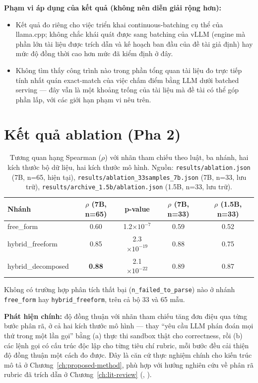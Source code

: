 \documentclass[a4paper,12pt]{report}
\begin{document}
\textbf{Phạm vi áp dụng của kết quả (không nên diễn giải rộng hơn):}
\begin{itemize}
  \item Kết quả đo riêng cho việc triển khai continuous-batching cụ thể của
    llama.cpp; không chắc khái quát được sang batching của vLLM (engine mà
    phần lớn tài liệu được trích dẫn và kế hoạch ban đầu của đề tài giả
    định) hay mức độ đồng thời cao hơn mức đã kiểm định ở đây.
  \item Không tìm thấy công trình nào trong phần tổng quan tài liệu đo trực
    tiếp tính nhất quán exact-match của việc chấm điểm bằng LLM dưới
    batched serving — đây vẫn là một khoảng trống của tài liệu mà đề tài
    có thể góp phần lấp, với các giới hạn phạm vi nêu trên.
\end{itemize}

\section{Kết quả ablation (Pha 2)}
\label{sec:results-ablation}

\begin{table}[h]
\centering
\begin{tabular}{lcccc}
\toprule
\textbf{Nhánh} & \textbf{$\rho$ (7B, n=65)} & \textbf{p-value} & \textbf{$\rho$ (7B, n=33)} & \textbf{$\rho$ (1.5B, n=33)} \\
\midrule
free\_form & 0.60 & 1.2$\times10^{-7}$ & 0.59 & 0.52 \\
hybrid\_freeform & 0.85 & 2.3$\times10^{-19}$ & 0.88 & 0.75 \\
hybrid\_decomposed & \textbf{0.88} & 2.1$\times10^{-22}$ & 0.89 & 0.87 \\
\bottomrule
\end{tabular}
\caption{Tương quan hạng Spearman ($\rho$) với nhãn tham chiếu theo luật,
ba nhánh, hai kích thước bộ dữ liệu, hai kích thước mô hình. Nguồn:
\texttt{results/ablation.json} (7B, n=65, hiện tại),
\texttt{results/ablation\_33samples\_7b.json} (7B, n=33, lưu trữ),
\texttt{results/archive\_1.5b/ablation.json} (1.5B, n=33, lưu trữ).}
\end{table}

Không có trường hợp phân tích thất bại (\texttt{n\_failed\_to\_parse}) nào
ở nhánh \texttt{free\_form} hay \texttt{hybrid\_freeform}, trên cả bộ 33 và
65 mẫu.

\textbf{Phát hiện chính:} độ đồng thuận với nhãn tham chiếu tăng đơn điệu
qua từng bước phân rã, ở cả hai kích thước mô hình — thay ``yêu cầu LLM
phán đoán mọi thứ trong một lần gọi'' bằng (a) thực thi sandbox thật cho
correctness, rồi (b) các lệnh gọi có cấu trúc độc lập cho từng tiêu chí
rubric, mỗi bước đều cải thiện độ đồng thuận một cách đo được. Đây là căn
cứ thực nghiệm chính cho kiến trúc mô tả ở
Chương~\ref{ch:proposed-method}, phù hợp với hướng nghiên cứu về phân rã
rubric đã trích dẫn ở Chương~\ref{ch:lit-review}
(\cite{rubric_decomposition}, \cite{survey_llm_judge}).
\end{document}
